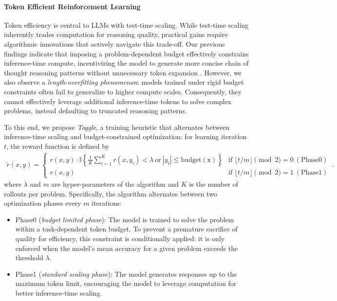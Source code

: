 \paragraph{Token Efficient Reinforcement Learning}
\label{sec:te}
Token efficiency is central to LLMs with test-time scaling. 
While test-time scaling inherently trades computation for reasoning quality, practical gains require algorithmic innovations that actively navigate this trade-off. 
Our previous findings indicate that imposing a problem-dependent budget effectively constrains inference-time compute, incentivizing the model to generate more concise chain of thought reasoning patterns without unnecessary token expansion \citep{team2025kimi,team2025kimik2}. 
However, we also observe a \emph{length-overfitting phenomenon}: models trained under rigid budget constraints often fail to generalize to higher compute scales. Consequently, they cannot effectively leverage additional inference-time tokens to solve complex problems, instead defaulting to truncated reasoning patterns.



To this end, we propose \emph{Toggle}, 
a training heuristic that alternates between {inference-time scaling} and {budget-constrained optimization}: 
for learning iteration $t$, 
the reward function is defined by 
\begin{align*}
\tilde{r}(x,y) = 
\begin{cases} 
r(x, y) \cdot \mathbb{I}\left\{ \frac{1}{K} \sum_{i=1}^K r(x, y_i)  < \lambda\ \mathrm{or}\ |y_i| \leq \mathrm{budget(x)} \right\} & \text{if } \lfloor t/m \rfloor \pmod 2 = 0\ (\mathrm{{Phase 0}}) \\
r(x, y) & \text{if } \lfloor t/m \rfloor \pmod 2 = 1\ (\mathrm{{Phase 1}}) 
\end{cases}
\, .
\end{align*}
where $\lambda$ and $m$ are hyper-parameters of the algorithm and $K$ is the number of rollouts per problem. 
Specifically, the algorithm alternates between two optimization phases every $m$ iterations:
\begin{itemize}

\item {Phase0} (\emph{budget limited phase}): 
The model is trained to solve the problem within a task-dependent token budget. 
To prevent a premature sacrifice of quality for efficiency, this constraint is conditionally applied: it is only enforced when the model's mean accuracy for a given problem exceeds the threshold $\lambda$.

\item {Phase1} (\emph{standard scaling phase}): The model generates responses up to the maximum token limit, encouraging the model to leverage computation for better inference-time scaling. 

\end{itemize}

